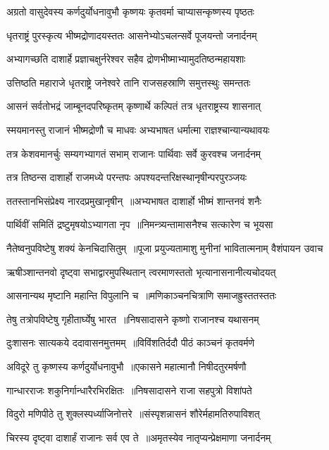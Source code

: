 \twolineshloka
{अग्रतो वासुदेवस्य कर्णदुर्योधनावुभौ}
{कृष्णयः कृतवर्मा चाप्यासन्कृष्णस्य पृष्ठतः}


\twolineshloka
{धृतराष्ट्रं पुरस्कृत्य भीष्मद्रोणादयस्ततः}
{आसनेभ्योऽचलन्सर्वे पूजयन्तो जनार्दनम्}


\twolineshloka
{अभ्यागच्छति दाशार्हे प्रज्ञाचक्षुर्नरेश्वर}
{सहैव द्रोणभीष्माभ्यामुदतिष्ठन्महायशाः}


\twolineshloka
{उत्तिष्ठति महाराजे धृतराष्ट्रे जनेश्वरे}
{तानि राजसहस्राणि समुत्तस्थुः समन्ततः}


\twolineshloka
{आसनं सर्वतोभद्रं जाम्बूनदपरिष्कृतम्}
{कृष्णार्थे कल्पितं तत्र धृतराष्ट्रस्य शासनात्}


\twolineshloka
{स्मयमानस्तु राजानं भीष्मद्रोणौ च माधवः}
{अभ्यभाषत धर्मात्मा राज्ञश्चान्यान्यथावयः}


\twolineshloka
{तत्र केशवमानर्चुः सम्यगभ्यागतं सभाम्}
{राजानः पार्थिवाः सर्वे कुरवश्च जनार्दनम्}


\threelineshloka
{तत्र तिष्ठन्स दाशार्हो राजमध्ये परन्तपः}
{अपश्यदन्तरिक्षस्थानृषीन्परपुरञ्जयः}
{}


\twolineshloka
{ततस्तानभिसंप्रेक्ष्य नारदप्रमुखानृषीन् ॥अभ्यभाषत दाशार्हो भीष्मं शान्तनवं शनैः}
{}


\twolineshloka
{पार्थिवीं समितिं द्रष्टुमृषयोऽभ्यागता नृप ॥निमन्त्र्यन्तामासनैश्च सत्कारेण च भूयसा}
{}


\threelineshloka
{नैतेष्वनुपविष्टेषु शक्यं केनचिदासितुम् ॥पूजा प्रयुज्यतामाशु मुनीनां भावितात्मनाम्}
{वैशंपायन उवाच}
{}


\threelineshloka
{ऋषीञ्शान्तनवो दृष्ट्वा सभाद्वारमुपस्थितान्}
{त्वरमाणस्ततो भृत्यानासनानीत्यचोदयत्}
{}


\twolineshloka
{आसनान्यथ मृष्टानि महान्ति विपुलानि च ॥मणिकाञ्चनचित्राणि समाजह्रुस्ततस्ततः}
{}


\twolineshloka
{तेषु तत्रोपविष्टेषु गृहीतार्घ्येषु भारत ॥निषसादासने कृष्णो राजानश्च यथासनम्}
{}


\twolineshloka
{दुःशासनः सात्यकये ददावासनमुत्तमम् ॥विविंशतिर्ददौ पीठं काञ्चनं कृतवर्मणे}
{}


\twolineshloka
{अविदूरे तु कृष्णस्य कर्णदुर्योधनावुभौ ॥एकासने महात्मानौ निषीदतुरमर्षणौ}
{}


\twolineshloka
{गान्धारराजः शकुनिर्गान्धारैरभिरक्षितः ॥निषसादासने राजा सहपुत्रो विशांपते}
{}


\twolineshloka
{विदुरो मणिपीठे तु शुक्लस्पर्ध्याजिनोत्तरे ॥संस्पृशन्नासनं शौरेर्महामतिरुपाविशत्}
{}


\twolineshloka
{चिरस्य दृष्ट्वा दाशार्हं राजानः सर्व एव ते ॥अमृतस्येव नातृप्यन्प्रेक्षमाणा जनार्दनम्}
{}


